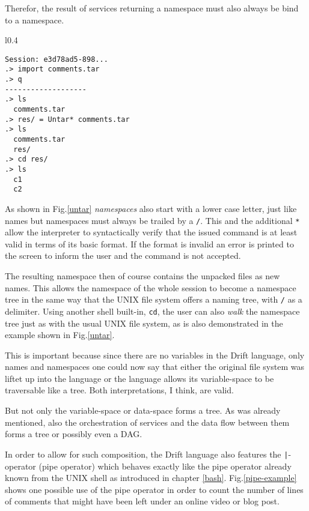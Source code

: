 Therefor, the result of services returning a namespace must
also always be bind to a namespace.

\begin{wrapfigure}{l}{0.4\textwidth}
  \begin{lstlisting}
Session: e3d78ad5-898...
.> import comments.tar
.> q
-------------------
.> ls
  comments.tar
.> res/ = Untar* comments.tar
.> ls
  comments.tar
  res/
.> cd res/
.> ls
  c1
  c2
  \end{lstlisting}
  \caption{Example of a name space binding.}
  \label{untar}
\end{wrapfigure}

As shown in Fig.\ref{untar} \textit{namespaces} also start with
a lower case letter, just like names but namespaces must always
be trailed by a \texttt{/}. This and the additional \texttt{*}
allow the interpreter to syntactically verify that the issued
command is at least valid in terms of its basic format.
If the format is invalid an error is printed to the screen to
inform the user and the command is not accepted.

The resulting namespace then of course contains the unpacked
files as new names. This allows the namespace of the whole session
to become a namespace tree in the same way that the UNIX file system
offers a naming tree, with \texttt{/} as a delimiter. Using another
shell built-in, \texttt{cd}, the user can also \textit{walk} the
namespace tree just as with the usual UNIX file system, as is
also demonstrated in the example shown in Fig.\ref{untar}.

This is important because since there are no variables in the
Drift language, only names and namespaces one could now say
that either the original file system was liftet up into the
language or the language allows its variable-space to be
traversable like a tree. Both interpretations, I think, are valid.

But not only the variable-space or data-space forms a tree. As
was already mentioned, also the orchestration of services and
the data flow between them forms a tree or possibly even a DAG.

In order to allow for such composition, the Drift language also
features the \texttt{|}-operator (pipe operator) which behaves
exactly like the pipe operator already known from the UNIX shell
as introduced in chapter \ref{bash}. Fig.\ref{pipe-example}
shows one possible use of the pipe operator in order to
count the number of lines of comments that might have been
left under an online video or blog post.

